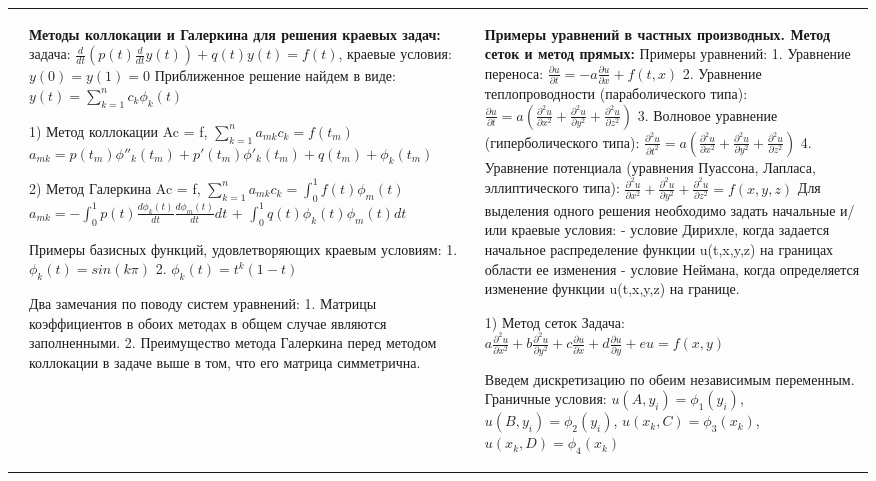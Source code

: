 \documentclass[a4paper,2pt]{article}
\begin{document}
\begin{tabular}{|p{}|p{}|p{}|}
&

\textbf{Методы коллокации и Галеркина для решения краевых задач:}
задача:
$\frac{d}{dt}(p(t)\frac{d}{dt}y(t)) + q(t)y(t) = f(t)$, краевые условия: $y(0)=y(1)=0$
Приближенное решение найдем в виде:
$y(t) = \sum_{k=1}^nc_k\phi_k(t)$

1) Метод коллокации
Ac = f, $\sum_{k=1}^na_{mk}c_k = f(t_m)$
$a_{mk} = p(t_m)\phi''_k(t_m) + p'(t_m)\phi'_k(t_m)+q(t_m)+\phi_k(t_m)$

2) Метод Галеркина
Ac = f,  $\sum_{k=1}^n a_{mk}c_k = \int_0^1f(t)\phi_m(t)$
$a_{mk} = -\int_0^1 p(t)\frac{d\phi_k(t)}{dt}\frac{d\phi_m(t)}{dt}dt$  +  $\int_0^1q(t)\phi_k(t)\phi_m(t)dt$

Примеры базисных функций, удовлетворяющих краевым условиям:
1. $\phi_k(t)=sin(k\pi)$
2. $\phi_k(t)=t^k(1-t)$

Два замечания по поводу систем уравнений: 1. Матрицы коэффициентов в обоих методах в общем случае являются заполненными. 2. Преимущество метода Галеркина перед методом коллокации в задаче выше в том, что его матрица симметрична.


&

\textbf{Примеры уравнений в частных производных. Метод сеток и метод прямых:}
Примеры уравнений:
1. Уравнение переноса: $\frac{\partial u}{\partial t} = -a\frac{\partial u}{\partial x}+f(t,x)$
2. Уравнение теплопроводности (параболического типа): $\frac{\partial u}{\partial t} = a(\frac{\partial^2 u}{\partial x^2}+\frac{\partial^2 u}{\partial y^2}+ \frac{\partial^2 u}{\partial z^2})$
3. Волновое уравнение (гиперболического типа): $\frac{\partial^2 u}{\partial t^2} = a(\frac{\partial^2 u}{\partial x^2}+\frac{\partial^2 u}{\partial y^2}+ \frac{\partial^2 u}{\partial z^2})$
4. Уравнение потенциала (уравнения Пуассона, Лапласа, эллиптического типа): $\frac{\partial^2 u}{\partial x^2}+\frac{\partial^2 u}{\partial y^2}+ \frac{\partial^2 u}{\partial z^2} = f(x,y,z)$
Для выделения одного решения необходимо задать начальные и/или краевые условия:
- условие Дирихле, когда задается начальное распределение функции u(t,x,y,z) на границах области ее изменения
- условие Неймана, когда определяется изменение функции u(t,x,y,z) на границе.

1) Метод сеток
Задача: $a\frac{\partial^2 u}{\partial x^2}+b\frac{\partial^2 u}{\partial y^2}+ c\frac{\partial u}{\partial x} + d\frac{\partial u}{\partial y}+eu = f(x,y)$

Введем дискретизацию по обеим независимым переменным.
Граничные условия:
$u(A, y_i) = \phi_1(y_i)$, $u(B, y_i) = \phi_2(y_i)$, $u(x_k, C) = \phi_3(x_k)$, $u(x_k, D) = \phi_4(x_k)$


\end{tabular}
\end{document}
